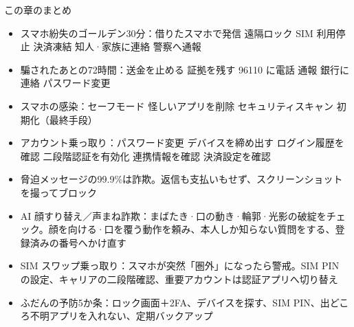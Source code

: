 \begin{tcbsummary}{この章のまとめ}
\begin{itemize}
  \item スマホ紛失のゴールデン30分：借りたスマホで発信 遠隔ロック SIM 利用停止 決済凍結 知人·家族に連絡 警察へ通報
  \item 騙されたあとの72時間：送金を止める 証拠を残す 96110 に電話 通報 銀行に連絡 パスワード変更
  \item スマホの感染：セーフモード 怪しいアプリを削除 セキュリティスキャン 初期化（最終手段）
  \item アカウント乗っ取り：パスワード変更 デバイスを締め出す ログイン履歴を確認 二段階認証を有効化 連携情報を確認 決済設定を確認
  \item 脅迫メッセージの99.9\%は詐欺。返信も支払いもせず、スクリーンショットを撮ってブロック
  \item AI 顔すり替え／声まね詐欺：まばたき·口の動き·輪郭·光影の破綻をチェック。顔を向ける·口を覆う動作を頼み、本人しか知らない質問をする、登録済みの番号へかけ直す
  \item SIM スワップ乗っ取り：スマホが突然「圏外」になったら警戒。SIM PIN の設定、キャリアの二段階確認、重要アカウントは認証アプリへ切り替え
  \item ふだんの予防5か条：ロック画面＋2FA、デバイスを探す、SIM PIN、出どころ不明アプリを入れない、定期バックアップ
\end{itemize}

\end{tcbsummary}
